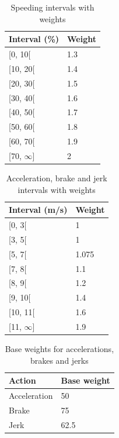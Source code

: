 \begin{table}
    \centering
    \begin{tabular}{ll}
    \textbf{Interval (\%)}   & \textbf{Weight} \\ \hline
    {[}0, 10{[}        & 1.3                   \\
    {[}10, 20{[}       & 1.4                   \\
    {[}20, 30{[}       & 1.5                   \\
    {[}30, 40{[}       & 1.6                   \\
    {[}40, 50{[}       & 1.7                   \\
    {[}50, 60{[}       & 1.8                   \\
    {[}60, 70{[}       & 1.9                   \\
    {[}70, $\infty${]} & 2                     \\ \hline
    \end{tabular}
    \caption{Speeding intervals with weights}
    \label{tab:speedingvalues}
\end{table}

\begin{table}
    \centering
    \begin{tabular}{ll}
    \textbf{Interval (m/s)} & \textbf{Weight} \\ \hline
    {[}0, 3{[}              & 1               \\
    {[}3, 5{[}              & 1               \\
    {[}5, 7{[}              & 1.075           \\
    {[}7, 8{[}              & 1.1             \\
    {[}8, 9{[}              & 1.2             \\
    {[}9, 10{[}             & 1.4             \\
    {[}10, 11{[}            & 1.6             \\
    {[}11, $\infty${]}      & 1.9             \\ \hline
    \end{tabular}
    \caption{Acceleration, brake and jerk intervals with weights}
    \label{tab:accelerationvalues}
\end{table}

\begin{table}
    \centering
    \begin{tabular}{ll}
    \textbf{Action} & \textbf{Base weight} \\ \hline
    Acceleration    & 50                   \\
    Brake           & 75                   \\
    Jerk            & 62.5                 \\ \hline
    \end{tabular}
    \caption{Base weights for accelerations, brakes and jerks}
    \label{tab:basevalues}
\end{table}

